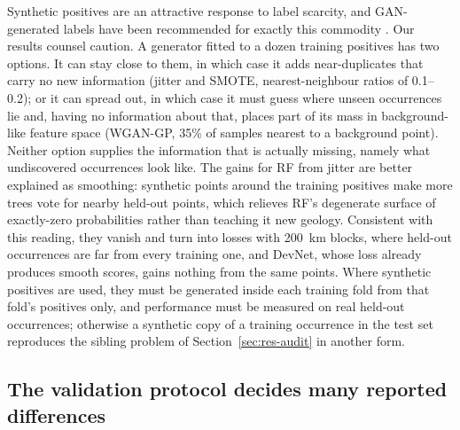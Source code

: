 \documentclass[pdflatex,sn-apa]{sn-jnl}
\begin{document}
Synthetic positives are an attractive response to label scarcity, and GAN-generated labels have been recommended for exactly this commodity \citep{Parsa2025}. Our results counsel caution. A generator fitted to a dozen training positives has two options. It can stay close to them, in which case it adds near-duplicates that carry no new information (jitter and SMOTE, nearest-neighbour ratios of 0.1--0.2); or it can spread out, in which case it must guess where unseen occurrences lie and, having no information about that, places part of its mass in background-like feature space (WGAN-GP, 35\% of samples nearest to a background point). Neither option supplies the information that is actually missing, namely what undiscovered occurrences look like. The gains for RF from jitter are better explained as smoothing: synthetic points around the training positives make more trees vote for nearby held-out points, which relieves RF's degenerate surface of exactly-zero probabilities rather than teaching it new geology. Consistent with this reading, they vanish and turn into losses with 200~km blocks, where held-out occurrences are far from every training one, and DevNet, whose loss already produces smooth scores, gains nothing from the same points. Where synthetic positives are used, they must be generated inside each training fold from that fold's positives only, and performance must be measured on real held-out occurrences; otherwise a synthetic copy of a training occurrence in the test set reproduces the sibling problem of Section~\ref{sec:res-audit} in another form.

\subsection{The validation protocol decides many reported differences}\label{sec:disc-protocol}
\end{document}
